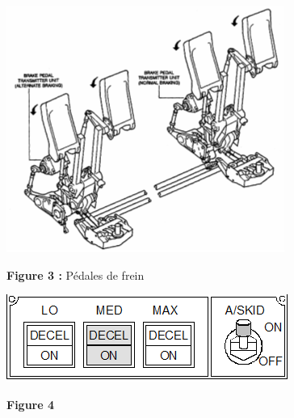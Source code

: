 \documentclass[11pt,oneside]{article}
\begin{document}
{\begin{minipage}[c]{.3\linewidth}
\begin{center}
\includegraphics[width=.95\textwidth]{png/image3.png}

\textbf{Figure 3 :} Pédales de frein
\end{center}
   
\begin{center}
\includegraphics[width=.95\textwidth]{png/image4.png}

\textbf{Figure 4}
\end{center}            


\end{minipage}}
\end{document}
